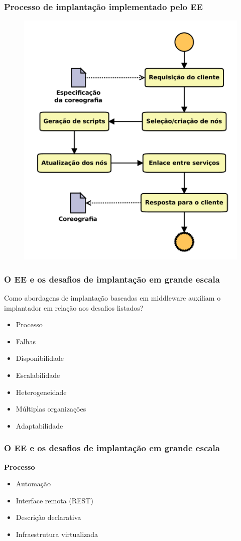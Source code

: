 \documentclass{beamer}
\newcommand\subtitulo[1]{{\large \textbf{#1}}}
\begin{document}
\begin{frame}
\frametitle{Processo de implantação implementado pelo EE}

\begin{figure}
\includegraphics[width=0.55\linewidth]{img/processo}
\end{figure}

\end{frame}



\begin{frame}
\frametitle{O EE e os desafios de implantação em grande escala}

Como abordagens de implantação baseadas em middleware auxiliam o implantador em relação aos desafios listados?

\begin{itemize}
\item Processo
\item Falhas
\item Disponibilidade
\item Escalabilidade
\item Heterogeneidade
\item Múltiplas organizações
\item Adaptabilidade
\end{itemize}

\end{frame}



\begin{frame}
\frametitle{O EE e os desafios de implantação em grande escala}	

\subtitulo{Processo}

\vspace{1cm}

\begin{itemize}
\item Automação
\item Interface remota (REST)
\item Descrição declarativa
\item Infraestrutura virtualizada
\end{itemize}

\end{frame}
\end{document}
